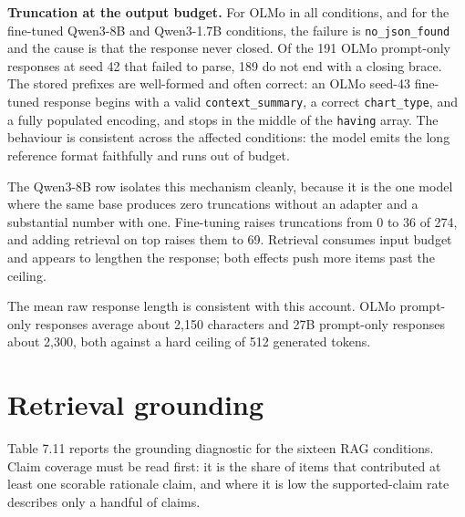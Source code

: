 \textbf{Truncation at the output budget.} For OLMo in all conditions, and for the fine-tuned Qwen3-8B and Qwen3-1.7B conditions, the failure is \texttt{no\_json\_found} and the cause is that the response never closed. Of the 191 OLMo prompt-only responses at seed 42 that failed to parse, 189 do not end with a closing brace. The stored prefixes are well-formed and often correct: an OLMo seed-43 fine-tuned response begins with a valid \texttt{context\_summary}, a correct \texttt{chart\_type}, and a fully populated encoding, and stops in the middle of the \texttt{having} array. The behaviour is consistent across the affected conditions: the model emits the long reference format faithfully and runs out of budget.

The Qwen3-8B row isolates this mechanism cleanly, because it is the one model where the same base produces zero truncations without an adapter and a substantial number with one. Fine-tuning raises truncations from 0 to 36 of 274, and adding retrieval on top raises them to 69. Retrieval consumes input budget and appears to lengthen the response; both effects push more items past the ceiling.

The mean raw response length is consistent with this account. OLMo prompt-only responses average about 2,150 characters and 27B prompt-only responses about 2,300, both against a hard ceiling of 512 generated tokens.

\section{Retrieval grounding}

Table 7.11 reports the grounding diagnostic for the sixteen RAG conditions. Claim coverage must be read first: it is the share of items that contributed at least one scorable rationale claim, and where it is low the supported-claim rate describes only a handful of claims.

